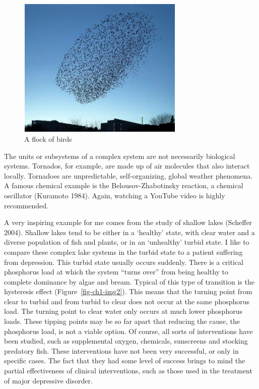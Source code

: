 \documentclass[
  letterpaper,
]{scrbook}
\begin{document}
\begin{figure}

{\centering \includegraphics[width=3.11597in,height=2.63958in]{media/ch1/image1.jpg}

}

\caption{\label{fig-ch1-img1}A flock of birds}

\end{figure}

The units or subsystems of a complex system are not necessarily
biological systems. Tornados, for example, are made up of air molecules
that also interact locally. Tornadoes are unpredictable,
self-organizing, global weather phenomena. A famous chemical example is
the Belousov-Zhabotinsky reaction, a chemical oscillator (Kuramoto
1984). Again, watching a YouTube video is highly recommended.

A very inspiring example for me comes from the study of shallow lakes
(Scheffer 2004). Shallow lakes tend to be either in a `healthy' state,
with clear water and a diverse population of fish and plants, or in an
`unhealthy' turbid state. I like to compare these complex lake systems
in the turbid state to a patient suffering from depression. This turbid
state usually occurs suddenly. There is a critical phosphorus load at
which the system ``turns over'' from being healthy to complete dominance
by algae and bream. Typical of this type of transition is the hysteresis
effect (Figure~\ref{fig-ch1-img2}). This means that the turning point
from clear to turbid and from turbid to clear does not occur at the same
phosphorus load. The turning point to clear water only occurs at much
lower phosphorus loads. These tipping points may be so far apart that
reducing the cause, the phosphorus load, is not a viable option. Of
course, all sorts of interventions have been studied, such as
supplemental oxygen, chemicals, sunscreens and stocking predatory fish.
These interventions have not been very successful, or only in specific
cases. The fact that they had some level of success brings to mind the
partial effectiveness of clinical interventions, such as those used in
the treatment of major depressive disorder.
\end{document}
